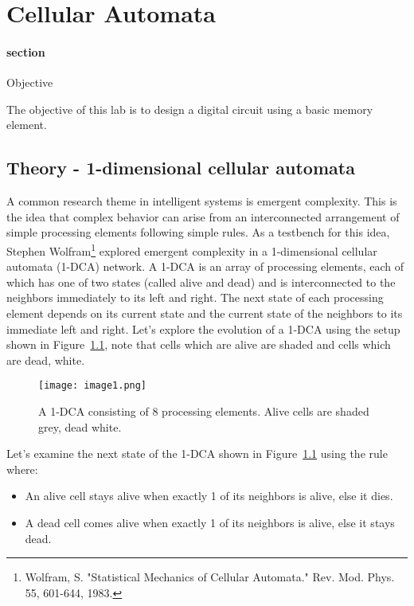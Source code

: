 \chapter{Cellular Automata}
\label{chapter:cellAuto}
\graphicspath{ {./Lab07CellularAutomata/Fig} }

\hypertarget{objective}{%
\subsubsection{section}{Objective }\label{section:caObjective}}

The objective of this lab is to design a digital circuit using a basic
memory element.

\section{Theory - 1-dimensional cellular automata}

A common research theme in intelligent systems is emergent complexity.
This is the idea that complex behavior can arise from an interconnected
arrangement of simple processing elements following simple rules. As a
testbench for this idea, Stephen Wolfram\footnote{Wolfram, S.
  "Statistical Mechanics of Cellular Automata." Rev. Mod. Phys. 55,
  601-644, 1983.} explored emergent complexity in a 1-dimensional
cellular automata (1-DCA) network. A 1-DCA is an array of processing
elements, each of which has one of two states (called alive and dead)
and is interconnected to the neighbors immediately to its left and
right. The next state of each processing element depends on its current
state and the current state of the neighbors to its immediate left and
right. Let's explore the evolution of a 1-DCA using the setup shown in
Figure~\ref{fig:exampleCA}, note that cells which are alive are shaded and cells which are
dead, white.

\begin{figure}
\texttt{[image: image1.png]}
\caption{A 1-DCA consisting of 8 processing elements. Alive cells are
shaded grey, dead white.}
\label{fig:exampleCA}
\end{figure}

Let's examine the next state of the 1-DCA shown in Figure~\ref{fig:exampleCA} 
using the rule where:

\begin{itemize}
\item
  An alive cell stays alive when exactly 1 of its neighbors is alive,
  else it dies.
\item
  A dead cell comes alive when exactly 1 of its neighbors is alive, else
  it stays dead.
\end{itemize}

